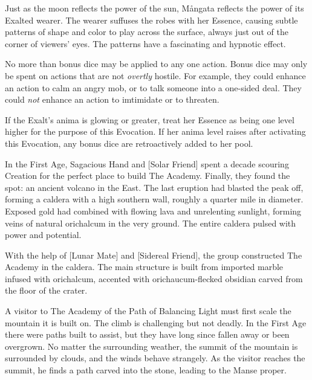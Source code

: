 
Just as the moon reflects the power of the sun, Mångata reflects the power of
its Exalted wearer. The wearer suffuses the robes with her Essence, causing
subtle patterns of shape and color to play across the surface, always just out
of the corner of viewers' eyes. The patterns have a fascinating and hypnotic
effect. 

No more than  bonus dice may be applied to any one action.
Bonus dice may only be spent on actions that are not \emph{overtly} hostile.
For example, they could enhance an action to calm an angry mob, or to talk
someone into a one-sided deal. They could \emph{not} enhance an action to
imtimidate or to threaten.

If the Exalt's anima is glowing or greater, treat her Essence as being one
level higher for the purpose of this Evocation. If her anima level raises after
activating this Evocation, any bonus dice are retroactively added to her pool.



In the First Age, Sagacious Hand and [Solar Friend] spent a decade scouring
Creation for the perfect place to build The Academy. Finally, they found the
spot: an ancient volcano in the East. The last eruption had blasted the peak
off, forming a caldera with a high southern wall, roughly a quarter mile in
diameter. Exposed gold had combined with flowing lava and unrelenting sunlight,
forming veins of natural orichalcum in the very ground. The entire caldera
pulsed with power and potential.

With the help of [Lunar Mate] and [Sidereal Friend], the group constructed The
Academy in the caldera. The main structure is built from imported marble
infused with orichalcum, accented with orichaucum-flecked obsidian carved from
the floor of the crater.

A visitor to The Academy of the Path of Balancing Light must first scale the
mountain it is built on. The climb is challenging but not deadly. In the First
Age there were paths built to assist, but they have long since fallen away or
been overgrown. No matter the surrounding weather, the summit of the mountain
is surrounded by clouds, and the winds behave strangely. As the visitor reaches
the summit, he finds a path carved into the stone, leading to the Manse proper.

